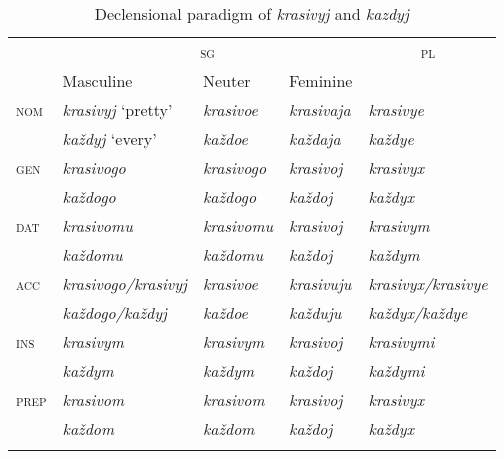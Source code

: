 \documentclass[output=paper]{langscibook}
\begin{document}
\begin{table}\caption{Declensional paradigm of \textit{krasivyj} and \textit{kazdyj}}\label{tab:2_kazdyj}
\begin{tabular}{>{\scshape}lllll}
\lsptoprule
&                   \multicolumn{3}{c}{\textsc{sg}}             & \multicolumn{1}{c}{\textsc{pl}}\\\cmidrule(lr){2-4}
&                   Masculine                   & Neuter                & Feminine              &\\
\midrule
nom&     \textit{krasivyj} `pretty'   & \textit{krasivoe}     & \textit{krasivaja}     & \textit{krasivye}\\ 
&               \textit{každyj} `every'      & \textit{každoe}       & \textit{každaja}       & \textit{každye}\\ 
\midrule
gen&       \textit{krasivogo}           & \textit{krasivogo}     & \textit{krasivoj}      & \textit{krasivyx}\\
&               \textit{každogo}             & \textit{každogo}       & \textit{každoj}        & \textit{každyx}\\ 
\midrule
dat&         \textit{krasivomu}           & \textit{krasivomu}     & \textit{krasivoj}      & \textit{krasivym}\\ 
&               \textit{každomu}             & \textit{každomu}       & \textit{každoj}        & \textit{každym}\\
\midrule
acc&     \textit{krasivogo/krasivyj}  & \textit{krasivoe}      & \textit{krasivuju}     & \textit{krasivyx/krasivye}\\
&               \textit{každogo/každyj}      & \textit{každoe}        & \textit{každuju}       & \textit{každyx/každye}\\
\midrule
ins&   \textit{krasivym}            & \textit{krasivym}      & \textit{krasivoj}      & \textit{krasivymi}\\
&               \textit{každym}              & \textit{každym}        & \textit{každoj}        & \textit{každymi}\\
\midrule
prep&  \textit{krasivom}            & \textit{krasivom}      & \textit{krasivoj}      & \textit{krasivyx}\\
&               \textit{každom}              & \textit{každom}        & \textit{každoj}        & \textit{každyx}\\
\lspbottomrule
\end{tabular}
\end{table}
\end{document}
